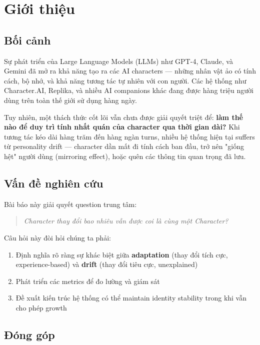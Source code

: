 \section{Giới thiệu}

\subsection{Bối cảnh}

Sự phát triển của Large Language Models (LLMs) như GPT-4, Claude, và Gemini đã mở ra khả năng tạo ra các AI characters --- những nhân vật ảo có tính cách, bộ nhớ, và khả năng tương tác tự nhiên với con người. Các hệ thống như Character.AI, Replika, và nhiều AI companions khác đang được hàng triệu người dùng trên toàn thế giới sử dụng hàng ngày.

Tuy nhiên, một thách thức cốt lõi vẫn chưa được giải quyết triệt để: \textbf{làm thế nào để duy trì tính nhất quán của character qua thời gian dài?} Khi tương tác kéo dài hàng trăm đến hàng ngàn turns, nhiều hệ thống hiện tại suffers từ personality drift --- character dần mất đi tính cách ban đầu, trở nên "giống hệt" người dùng (mirroring effect), hoặc quên các thông tin quan trọng đã lưu.

\subsection{Vấn đề nghiên cứu}

Bài báo này giải quyết question trung tâm:

\begin{quote}
\textit{Character thay đổi bao nhiêu vẫn được coi là cùng một Character?}
\end{quote}

Câu hỏi này đòi hỏi chúng ta phải:
\begin{enumerate}
    \item Định nghĩa rõ ràng sự khác biệt giữa \textbf{adaptation} (thay đổi tích cực, experience-based) và \textbf{drift} (thay đổi tiêu cực, unexplained)
    \item Phát triển các metrics để đo lường và giám sát
    \item Đề xuất kiến trúc hệ thống có thể maintain identity stability trong khi vẫn cho phép growth
\end{enumerate}

\subsection{Đóng góp}

